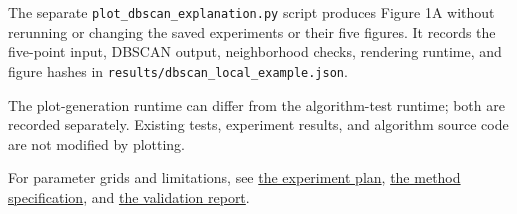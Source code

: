 \documentclass[14pt,a4paper,landscape]{extarticle}
\begin{document}
The separate \texttt{plot\_dbscan\_explanation.py} script produces Figure 1A
without rerunning or changing the saved experiments or their five figures.
It records the five-point input, DBSCAN output, neighborhood checks,
rendering runtime, and figure hashes in
\texttt{results/dbscan\_local\_example.json}.

The plot-generation runtime can differ from the algorithm-test runtime;
both are recorded separately. Existing tests, experiment results, and
algorithm source code are not modified by plotting.

For parameter grids and limitations, see \href{../experiment_plan.md}{the experiment plan}, \href{../method_spec.md}{the method specification}, and \href{../validation_report.md}{the validation report}.
\end{document}
